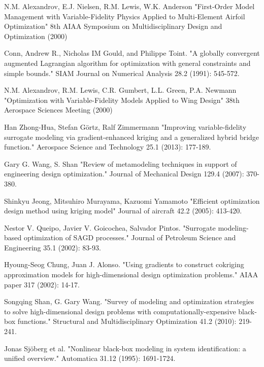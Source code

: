 \documentclass[a4paper,onecolumn]{article}
\theoremstyle{remark}
\begin{document}
\begin{thebibliography}{9}
N.M. Alexandrov, E.J. Nielsen, R.M. Lewis, W.K. Anderson
"First-Order Model Management with Variable-Fidelity Physics 
Applied to Multi-Element Airfoil Optimization"
8th AIAA Symposium on Multidisciplinary Design and Optimization (2000)

Conn, Andrew R., Nicholas IM Gould, and Philippe Toint. 
"A globally convergent augmented Lagrangian algorithm for optimization with general constraints and simple bounds."
SIAM Journal on Numerical Analysis 28.2 (1991): 545-572.

N.M. Alexandrov, R.M. Lewis, C.R. Gumbert, L.L. Green, P.A. Newmann
"Optimization with Variable-Fidelity Models Applied to Wing Design"
38th Aerospace Sciences Meeting (2000)

Han Zhong-Hua, Stefan Görtz, Ralf Zimmermann
"Improving variable-fidelity surrogate modeling via gradient-enhanced kriging and a generalized hybrid bridge function."
Aerospace Science and Technology 25.1 (2013): 177-189.

Gary G. Wang, S. Shan
"Review of metamodeling techniques in support of engineering design optimization."
Journal of Mechanical Design 129.4 (2007): 370-380.

Shinkyu Jeong, Mitsuhiro Murayama, Kazuomi Yamamoto
"Efficient optimization design method using kriging model" 
Journal of aircraft 42.2 (2005): 413-420.

Nestor V. Queipo, Javier V. Goicochea, Salvador Pintos. 
"Surrogate modeling-based optimization of SAGD processes." 
Journal of Petroleum Science and Engineering 35.1 (2002): 83-93.

Hyoung-Seog Chung, Juan J. Alonso. 
"Using gradients to construct cokriging approximation models for high-dimensional design optimization problems." 
AIAA paper 317 (2002): 14-17.

Songqing Shan, G. Gary Wang. 
"Survey of modeling and optimization strategies to solve high-dimensional design problems with computationally-expensive black-box functions." 
Structural and Multidisciplinary Optimization 41.2 (2010): 219-241.

Jonas Sjöberg et al.
"Nonlinear black-box modeling in system identification: a unified overview." 
Automatica 31.12 (1995): 1691-1724.


\end{thebibliography}
\end{document}

